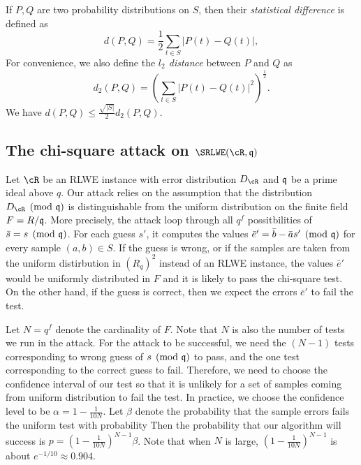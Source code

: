\documentclass{amsart}
\begin{document}
If $P,Q$ are two probability distributions on $S$, then their {\it statistical difference} is defined as
\[
    d(P,Q) = \frac{1}{2} \sum_{t \in S} |P(t) - Q(t)|,
\]
For convenience, we also define the {\it $l_2$ distance} between $P$ and $Q$ as
\[
    d_2(P,Q) = (\sum_{t \in S} |P(t) - Q(t)|^2)^{\frac{1}{2}}.
\]
We have $d(P,Q) \leq \frac{\sqrt{|S|}}{2}d_2(P,Q)$.



\subsection{The chi-square attack on $\SRLWE(\cR,\fq)$}

Let $\cR$ be an RLWE instance with error distribution $D_{\cR}$ and $\mathfrak{q}$ be a prime ideal above $q$.  Our attack relies on the assumption that the distribution $D_\cR \pmod {\fq}$ is distinguishable from the uniform distribution on the finite field $F = R/\mathfrak{q}$. More precisely, the attack loop through all $q^f$ possitbilities of $\bar{s} = s \pmod{\mathfrak{q}}$. For each guess $s'$, it computes the values $\bar{e}' = \bar{b} - \bar{a} s' \pmod {\mathfrak{q}}$ for every sample $(a,b) \in S$. If the guess is wrong, or if the samples are taken from the uniform distirbution in $(R_q)^2$ instead of an RLWE instance, the values $\bar{e}'$ would be uniformly distributed in $F$ and it is likely to pass the chi-square test. On the other hand, if the guess is correct, then we expect the errors $\bar{e}'$ to fail the test.

Let $N = q^f$ denote the cardinality of $F$. Note that $N$ is also the number of tests we run in the attack. For the attack to be successful, we need the $(N-1)$ tests corresponding to wrong guess of $s \pmod{\mathfrak{q}}$ to pass, and the one test corresponding to the correct guess to fail. Therefore, we need to choose the confidence interval of our test so that it is unlikely for a set of samples coming from uniform distribution to fail the test. In practice, we choose the confidence level to be  $\alpha = 1 - \frac{1}{10N}$. Let $\beta$ denote the probability that the sample errors fails the uniform test with probability  Then the probability that our algorithm will success is $p  = (1- \frac{1}{10N})^{N-1} \beta$. Note that when $N$ is large, $(1- \frac{1}{10N})^{N-1}$ is about $e^{-1/10} \approx 0.904$.


\end{document}
